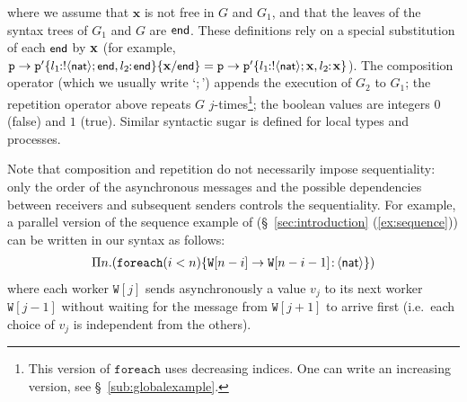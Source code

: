 \documentclass{LMCS}
\newcommand{\kf}[1]{\textup{\textsf{#1}}\xspace}
\newcommand{\participant}[1]{\ensuremath{\mathtt{#1}}}
\newcommand{\p}{\ensuremath{\participant{p}}}
\newcommand{\true}{\kf{true}}
\newcommand{\false}{\kf{false}}
\newcommand{\sub}[2]{\ensuremath{\{#1/#2\}}}
\newcommand{\G}{\ensuremath{G}}
\newcommand{\End}{\kf{end}}
\newcommand{\Nat}{\kf{nat}}
\newcommand{\ENCan}[1]{\langle #1 \rangle}
\newcommand{\TO}[2]{#1\to #2}
\newcommand{\GS}[3]{\TO{#1}{#2}\colon \!\ENCan{#3}}
\newcommand{\ii}{\ensuremath{i}}
\newcommand{\jj}{\ensuremath{j}}
\newcommand{\xx}{\ensuremath{\mathbf{x}}}
\newcommand{\W}{\ensuremath{\mathtt{W}}}
\newcommand{\FOREACH}[3]{\ensuremath{\mathtt{foreach}(#1 #2)\{#3\}}}
\begin{document}
\noindent
where we assume that $\xx$ is not free in $G$ and $G_1$, and
that the leaves of the syntax trees of $G_1$ and $G$ are 
$\End$. 
These definitions rely on a special substitution of each ${\small\End}$ by ${\small\xx}$ (for example, 
${\small \TO{\p}{\p'}\{ l_1\!\!: !\ENCan{\Nat};\End, l_2\!\!:\!\End\}\sub{\xx}{\End}=
\TO{\p}{\p'}\{ l_1\!\!: !\ENCan{\Nat};\xx, l_2\!\!:\! \xx\}}$). 
The composition operator (which we usually write `$;$')
appends the execution of $G_2$ to $G_1$; the repetition operator above repeats
$\G$ $\jj$-times\footnote{
This version of $\mathtt{foreach}$ uses decreasing indices. One can write an
increasing version, see \S~\ref{sub:globalexample}.}; the boolean values are integers $0$
(\false) and $1$ (\true).
Similar syntactic sugar is defined for local types and processes. 

Note that composition and repetition do not necessarily impose 
sequentiality: only the order of the asynchronous messages and the 
possible dependencies~\cite{CHY07} between receivers and subsequent senders
controls the sequentiality. For example, a parallel version of 
the sequence example of
(\S~\ref{sec:introduction} (\ref{ex:sequence})) can be written in our
syntax as follows: 
\begin{eqnarray}\label{parallel_seq}
 \Pi n.(\FOREACH{\ii}{<n}{\GS{\W[n-\ii]}{\W[n-\ii-1]}{\Nat}})
\end{eqnarray}
where each worker $\W[\jj]$ sends asynchronously a value $v_j$ to its next 
worker $\W[\jj-1]$ without waiting for the message from $\W[\jj+1]$ to arrive
first (i.e.~each choice of $v_j$ is independent from the others). 


\label{subsec:examples}
\end{document}
